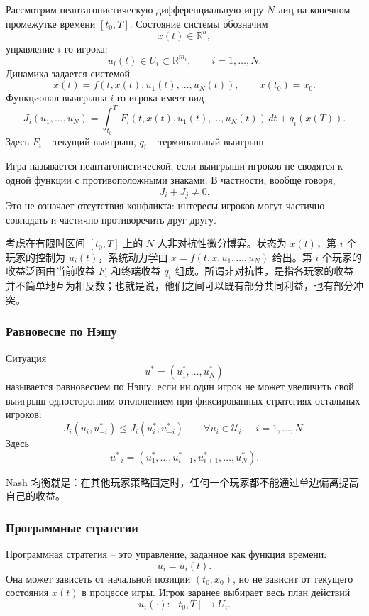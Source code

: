 \documentclass[12pt,a4paper]{article}
\newcommand{\R}{\mathbb{R}}
\newcommand{\zh}[1]{\par\noindent #1\par}
\begin{document}




Рассмотрим неантагонистическую дифференциальную игру $N$ лиц на конечном промежутке времени $[t_0,T]$. Состояние системы обозначим
\[
 x(t)\in\R^n,
\]
управление $i$-го игрока:
\[
 u_i(t)\in U_i\subset\R^{m_i},\qquad i=1,\ldots,N.
\]
Динамика задается системой
\[
 \dot x(t)=f(t,x(t),u_1(t),\ldots,u_N(t)),\qquad x(t_0)=x_0.
\]
Функционал выигрыша $i$-го игрока имеет вид
\[
 J_i(u_1,\ldots,u_N)=\int_{t_0}^{T}F_i(t,x(t),u_1(t),\ldots,u_N(t))\,dt+q_i(x(T)).
\]
Здесь $F_i$ -- текущий выигрыш, $q_i$ -- терминальный выигрыш.

Игра называется неантагонистической, если выигрыши игроков не сводятся к одной функции с противоположными знаками. В частности, вообще говоря,
\[
 J_i+J_j\ne0.
\]
Это не означает отсутствия конфликта: интересы игроков могут частично совпадать и частично противоречить друг другу.
\zh{考虑在有限时区间 \([t_0,T]\) 上的 \(N\) 人非对抗性微分博弈。状态为 \(x(t)\)，第 \(i\) 个玩家的控制为 \(u_i(t)\)，系统动力学由 \(\dot x=f(t,x,u_1,\ldots,u_N)\) 给出。第 \(i\) 个玩家的收益泛函由当前收益 \(F_i\) 和终端收益 \(q_i\) 组成。所谓非对抗性，是指各玩家的收益并不简单地互为相反数；也就是说，他们之间可以既有部分共同利益，也有部分冲突。}

\subsubsection{Равновесие по Нэшу}

Ситуация
\[
 u^*=(u_1^*,\ldots,u_N^*)
\]
называется равновесием по Нэшу, если ни один игрок не может увеличить свой выигрыш односторонним отклонением при фиксированных стратегиях остальных игроков:
\[
 J_i(u_i,u_{-i}^*)\le J_i(u_i^*,u_{-i}^*)
 \qquad \forall u_i\in\mathcal U_i,\quad i=1,\ldots,N.
\]
Здесь
\[
 u_{-i}^*=(u_1^*,\ldots,u_{i-1}^*,u_{i+1}^*,\ldots,u_N^*).
\]
\zh{Nash 均衡就是：在其他玩家策略固定时，任何一个玩家都不能通过单边偏离提高自己的收益。}

\subsubsection{Программные стратегии}

Программная стратегия -- это управление, заданное как функция времени:
\[
 u_i=u_i(t).
\]
Она может зависеть от начальной позиции $(t_0,x_0)$, но не зависит от текущего состояния $x(t)$ в процессе игры. Игрок заранее выбирает весь план действий
\[
 u_i(\cdot):[t_0,T]\to U_i.
\]
\end{document}

